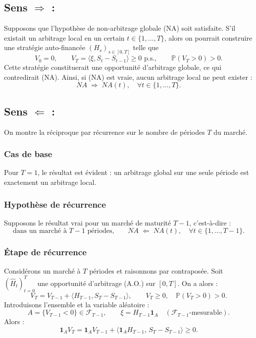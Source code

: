 \documentclass[12pt,a4paper]{article}
\makeatletter
\numberwithin{equation}{section}
\theoremstyle{plain} %
\theoremstyle{definition} %
\theoremstyle{remark} %
\theoremstyle{myexample}
\theoremstyle{definition}
\renewenvironment{proof}[1][\proofname]{%
  \par\vspace{0.8em}%
  \pushQED{\qed}%
  \normalfont\color{cyan}%
  \topsep6\p@\@plus6\p@\relax
  \trivlist
  \item[\hskip\labelsep\bfseries\color{cyan}#1\@addpunct{.}]\ignorespaces
}{%
  \popQED\endtrivlist\vspace{0.8em}%
}
\makeatother
\begin{document}
\begin{proof}[Preuve du lemme : $NA \Longleftrightarrow NA(t)\ \forall t$]
\subsection*{Sens $\Rightarrow$ :}
Supposons que l’hypothèse de non-arbitrage globale (NA) soit satisfaite.  
S’il existait un arbitrage local en un certain $t \in \{1,\ldots,T\}$, alors on pourrait construire une stratégie auto-financée $(H_s)_{s\in[0,T]}$ telle que
\[
V_0 = 0, \qquad 
V_T = \langle \xi, S_t - S_{t-1} \rangle \ge 0 \text{ p.s.}, \qquad 
\mathbb{P}(V_T > 0) > 0.
\]
Cette stratégie constituerait une opportunité d’arbitrage globale, ce qui contredirait (NA).  
Ainsi, si (NA) est vraie, aucun arbitrage local ne peut exister :
\[
NA \;\Rightarrow\; NA(t), \quad \forall t\in\{1,\ldots,T\}.
\]

\subsection*{Sens $\Leftarrow$ :}
On montre la réciproque par récurrence sur le nombre de périodes $T$ du marché.

\subsubsection*{Cas de base}
Pour $T=1$, le résultat est évident : un arbitrage global sur une seule période est exactement un arbitrage local.

\subsubsection*{Hypothèse de récurrence}
Supposons le résultat vrai pour un marché de maturité $T-1$, c’est-à-dire :
\[
\text{dans un marché à $T-1$ périodes,} \qquad
NA \;\Leftarrow\; NA(t), \quad \forall t \in \{1,\ldots,T-1\}.
\]

\subsubsection*{Étape de récurrence}
Considérons un marché à $T$ périodes et raisonnons par contraposée.  
Soit $(\hat H_t)_{t=0}^T$ une opportunité d’arbitrage (A.O.) sur $[0,T]$.  
On a alors :
\[
V_T = V_{T-1} + \langle H_{T-1}, S_T - S_{T-1} \rangle, 
\qquad V_T \ge 0,\quad \mathbb{P}(V_T > 0) > 0.
\]
Introduisons l’ensemble et la variable aléatoire :
\[
A = \{ V_{T-1} < 0 \} \in \mathcal{F}_{T-1},
\qquad
\xi = H_{T-1}\mathbf{1}_A \quad (\mathcal{F}_{T-1}\text{-mesurable}).
\]
Alors :
\[
\mathbf{1}_A V_T
= \mathbf{1}_A V_{T-1}
+ \big\langle \mathbf{1}_A H_{T-1},\, S_T - S_{T-1} \big\rangle
\ge 0.
\]


\end{proof}
\end{document}
